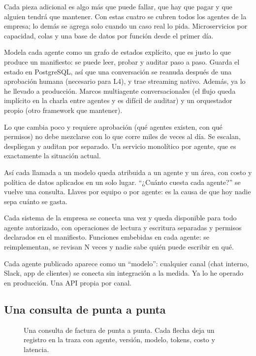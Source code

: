 {Cada pieza adicional es algo más que puede fallar, que hay que pagar y que alguien tendrá que
mantener. Con estas cuatro se cubren todos los agentes de la empresa; lo demás se agrega solo cuando
un caso real lo pida.}
{Microservicios por capacidad, colas y una base de datos por función desde el primer día.}

{Modela cada agente como un grafo de estados explícito, que es justo lo que produce un
manifiesto: se puede leer, probar y auditar paso a paso. Guarda el estado en PostgreSQL, así
que una conversación se reanuda después de una aprobación humana (necesario para L4), y trae
streaming nativo. Además, ya lo he llevado a producción.}
{Marcos multiagente conversacionales (el flujo queda implícito en la charla entre agentes y es
difícil de auditar) y un orquestador propio (otro framework que mantener).}

{Lo que cambia poco y requiere aprobación (qué agentes existen, con qué permisos) no debe
mezclarse con lo que corre miles de veces al día. Se escalan, despliegan y auditan por
separado.}
{Un servicio monolítico por agente, que es exactamente la situación actual.}

{Así cada llamada a un modelo queda atribuida a un agente y un área, con costo y política de
datos aplicados en un solo lugar. ``¿Cuánto cuesta cada agente?'' se vuelve una consulta.}
{Llaves por equipo o por agente: es la causa de que hoy nadie sepa cuánto se gasta.}

{Cada sistema de la empresa se conecta una vez y queda disponible para todo agente autorizado, con
operaciones de lectura y escritura separadas y permisos declarados en el manifiesto.}
{Funciones embebidas en cada agente: se reimplementan, se revisan N veces y nadie sabe quién
puede escribir en qué.}

{Cada agente publicado aparece como un ``modelo'': cualquier canal (chat interno, Slack, app
de clientes) se conecta sin integración a la medida. Ya lo he operado en producción.}
{Una API propia por canal.}

\subsection{Una consulta de punta a punta}
\begin{figure}[!htbp]
  \centering
  
  \caption{Una consulta de factura de punta a punta. Cada flecha deja un registro en la traza
  con agente, versión, modelo, tokens, costo y latencia.}
  \label{fig:secuencia}
\end{figure}

